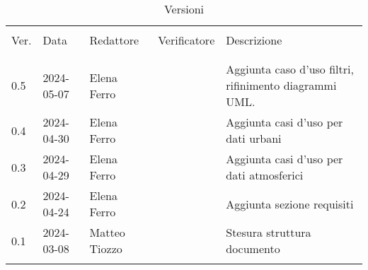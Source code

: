 \documentclass[12pt]{article}
\begin{document}


\newpage



\captionsetup[table]{list=no}
\begin{table}[!h]
	\footnotesize
	\begin{center}
		\caption*{Versioni}
		\vspace{0.5cm}
		\begin{tabular}{ l l l l p{6.1cm} }
			\hline                                                                                                    \\[-2ex]
			Ver. & Data       & Redattore     & Verificatore & Descrizione                                            \\
			\\[-2ex] \hline \\[-1.5ex]
			0.5  & 2024-05-07 & Elena Ferro   &              & Aggiunta caso d'uso filtri, rifinimento diagrammi UML. \\
			0.4  & 2024-04-30 & Elena Ferro   &              & Aggiunta casi d'uso per dati urbani                    \\
			0.3  & 2024-04-29 & Elena Ferro   &              & Aggiunta casi d'uso per dati atmosferici               \\
			0.2  & 2024-04-24 & Elena Ferro   &              & Aggiunta sezione requisiti                             \\
			0.1  & 2024-03-08 & Matteo Tiozzo &              & Stesura struttura documento                            \\
			\\[-1.5ex] \hline
		\end{tabular}
	\end{center}
\end{table}
\captionsetup[table]{list=yes}

\newpage

\tableofcontents
\listoftables
\listoffigures

\newpage








\end{document}

